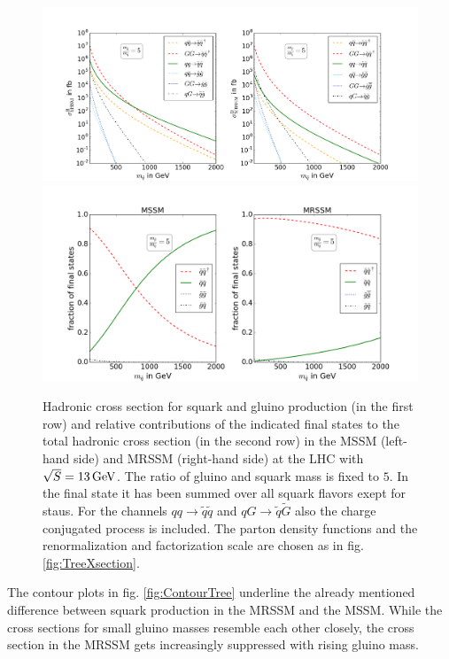 \begin{figure}[!htpb]
\begin{center}
\includegraphics[scale=.4]{figures/mr=5_MSSM+MRSSM}
\includegraphics[scale=.45]{figures/rel_weights_mr=5_MSSM+MRSSM}
\caption{Hadronic cross section for squark and gluino production (in the first row) and relative contributions of the indicated final states to the total hadronic cross section (in the second row) in the MSSM (left-hand side) and MRSSM (right-hand side) at the LHC with $\sqrt{S} = \unit[13]{GeV}$. The ratio of gluino and squark mass is fixed to $5$. In the final state it has been summed over all squark flavors exept for staus. For the channels $qq \to \tilde{q}\tilde{q}$ and $qG \to \tilde{q}\tilde{G}$ also the charge conjugated process is included. The parton density functions and the renormalization and factorization scale are chosen as in fig. \ref{fig:TreeXsection}.}\label{fig:TreeXsection5}
\end{center}
\end{figure}
\newpage
The contour plots in fig. \ref{fig:ContourTree} underline the already mentioned difference between squark production in the MRSSM and the MSSM. While the cross sections for small gluino masses resemble each other closely, the cross section in the MRSSM gets increasingly suppressed with rising gluino mass. 
